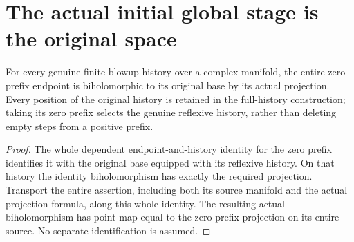 \section{The actual initial global stage is the original space}

\begin{lemma}
\label{hir:sharp-actual-curve-zero-prefix-biholomorphism}
\leanok
For every genuine finite blowup history over a complex manifold, the entire
zero-prefix endpoint is biholomorphic to its original base by its actual
projection. Every position of the original history is retained in the
full-history construction; taking its zero prefix selects the genuine
reflexive history, rather than deleting empty steps from a positive prefix.
\end{lemma}
\begin{proof}
The whole dependent endpoint-and-history identity for the zero prefix
identifies it with the original base equipped with its reflexive history.
On that history the identity biholomorphism has exactly the required
projection. Transport the entire assertion, including both its source
manifold and the actual projection formula, along this whole identity.
The resulting actual biholomorphism has point map equal to the zero-prefix
projection on its entire source. No separate identification is assumed.
\end{proof}

